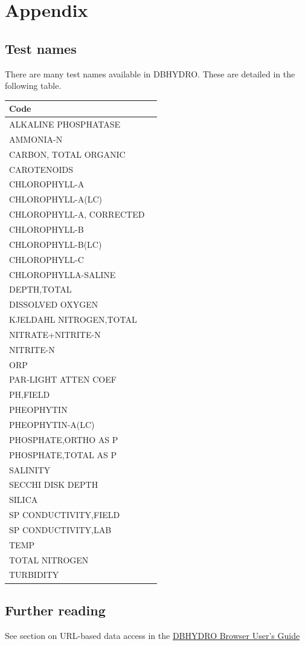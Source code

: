 \documentclass[12pt,notitlepage]{article}
\begin{document}
\section{\label{sec:appendix}Appendix}
\subsection{Test names}
There are many test names available in DBHYDRO. These are detailed in the following table.\\

\begin{longtable}{| p{} | p{} |} 
\hline
Code\\
\hline
ALKALINE PHOSPHATASE\\
AMMONIA-N\\
CARBON, TOTAL ORGANIC\\
CAROTENOIDS\\
CHLOROPHYLL-A\\
CHLOROPHYLL-A(LC)\\
CHLOROPHYLL-A, CORRECTED\\
CHLOROPHYLL-B\\
CHLOROPHYLL-B(LC)\\
CHLOROPHYLL-C\\
CHLOROPHYLLA-SALINE\\
DEPTH,TOTAL\\
DISSOLVED OXYGEN\\
KJELDAHL NITROGEN,TOTAL\\
NITRATE+NITRITE-N\\
NITRITE-N\\
ORP\\
PAR-LIGHT ATTEN COEF\\
PH,FIELD\\
PHEOPHYTIN\\
PHEOPHYTIN-A(LC)\\
PHOSPHATE,ORTHO AS P\\
PHOSPHATE,TOTAL AS P\\
SALINITY\\
SECCHI DISK DEPTH\\
SILICA\\
SP CONDUCTIVITY,FIELD\\
SP CONDUCTIVITY,LAB\\
TEMP\\
TOTAL NITROGEN\\
TURBIDITY\\
\hline
\end{longtable}

\subsection{Further reading}
See section on URL-based data access in the \href{http://www.sfwmd.gov/portal/page/portal/xrepository/sfwmd_repository_pdf/dbhydrobrowsweruserdocumentation.pdf}{DBHYDRO Browser User's Guide}

\medskip
 


 
\end{document}
